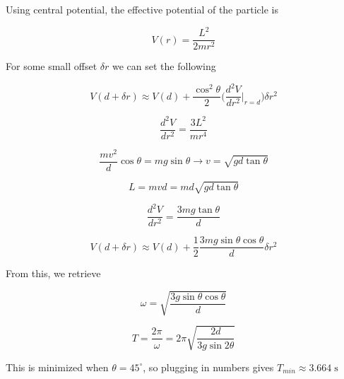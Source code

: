 \begin{solution}
Using central potential, the effective potential of the particle is

$$V(r) = \frac{L^2}{2mr^2}$$

For some small offset $\delta r$ we can set the following

$$V(d + \delta r) \approx V(d) + \frac{\cos^2\theta}{2}\bigg(\frac{d^2V}{dr^2}\bigg|_{r=d}\bigg)\delta r^2$$

$$\frac{d^2V}{dr^2} = \frac{3L^2}{mr^4}$$

$$\frac{mv^2}{d}\cos\theta = mg\sin\theta\longrightarrow v = \sqrt{gd\tan\theta}$$

$$L = mvd = md\sqrt{gd\tan\theta}$$

$$\frac{d^2V}{dr^2} = \frac{3mg\tan\theta}{d}$$

$$V(d+\delta r) \approx V(d) + \frac{1}{2}\frac{3mg\sin\theta\cos\theta}{d}\delta r^2$$

From this, we retrieve

$$\omega = \sqrt{\frac{3g\sin\theta\cos\theta}{d}}$$

$$T = \frac{2\pi}{\omega} = 2\pi\sqrt{\frac{2d}{3g\sin2\theta}}$$

This is minimized when $\theta = 45^{\circ}$, so plugging in numbers gives $T_{min} \approx \boxed{3.664\;\mathrm{s}}$

\end{solution}